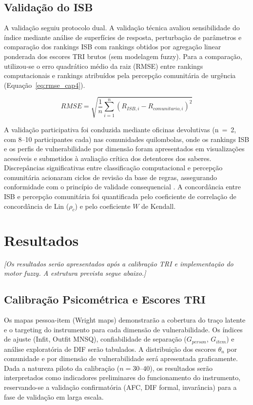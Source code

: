 \subsection{Validação do ISB}

A validação seguiu protocolo dual. A validação técnica avaliou sensibilidade do índice mediante análise de superfícies de resposta, perturbação de parâmetros e comparação dos rankings ISB com rankings obtidos por agregação linear ponderada dos escores TRI brutos (sem modelagem fuzzy). Para a comparação, utilizou-se o erro quadrático médio da raiz (RMSE) entre rankings computacionais e rankings atribuídos pela percepção comunitária de urgência (Equação~\ref{eq:rmse_cap4}).

\begin{equation}
RMSE = \sqrt{\frac{1}{n}\sum_{i=1}^{n}(R_{ISB,i} - R_{comunitario,i})^2}
\label{eq:rmse_cap4}
\end{equation}

A validação participativa foi conduzida mediante oficinas devolutivas (n~=~2, com 8--10 participantes cada) nas comunidades quilombolas, onde os rankings ISB e os perfis de vulnerabilidade por dimensão foram apresentados em visualizações acessíveis e submetidos à avaliação crítica dos detentores dos saberes. Discrepâncias significativas entre classificação computacional e percepção comunitária acionaram ciclos de revisão da base de regras, assegurando conformidade com o princípio de validade consequencial \cite{Messick1995}. A concordância entre ISB e percepção comunitária foi quantificada pelo coeficiente de correlação de concordância de Lin ($\rho_c$) e pelo coeficiente $W$ de Kendall.


\section{Resultados}

\textit{[Os resultados serão apresentados após a calibração TRI e implementação do motor fuzzy. A estrutura prevista segue abaixo.]}

\subsection{Calibração Psicométrica e Escores TRI}

Os mapas pessoa-item (Wright maps) demonstrarão a cobertura do traço latente e o targeting do instrumento para cada dimensão de vulnerabilidade. Os índices de ajuste (Infit, Outfit MNSQ), confiabilidade de separação ($G_{person}$, $G_{item}$) e análise exploratória de DIF serão tabulados. A distribuição dos escores $\theta_n$ por comunidade e por dimensão de vulnerabilidade será apresentada graficamente. Dada a natureza piloto da calibração ($n = 30$--$40$), os resultados serão interpretados como indicadores preliminares do funcionamento do instrumento, reservando-se a validação confirmatória (AFC, DIF formal, invarância) para a fase de validação em larga escala.


